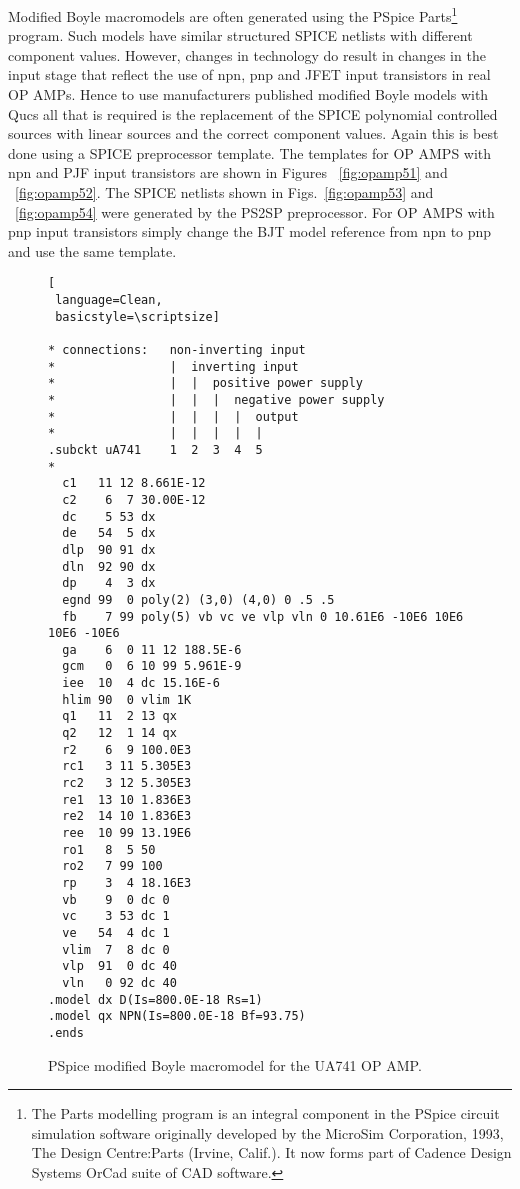 Modified Boyle macromodels are often generated using the PSpice Parts\footnote{The Parts modelling program is an integral component in the PSpice circuit simulation software originally developed by the MicroSim Corporation, 1993, The Design Centre:Parts (Irvine, Calif.). It now forms part of Cadence Design Systems OrCad suite of CAD software.} program.  Such models have similar structured SPICE netlists with different component values. However, changes in technology do result in changes in the input stage that reflect the use of npn, pnp and JFET input transistors in real OP AMPs.  Hence to use manufacturers published modified Boyle models with Qucs all that is required is the replacement of the SPICE polynomial controlled sources with linear sources and the correct component values. Again this is best done using a SPICE preprocessor template. The templates for OP AMPS with npn and PJF input transistors are shown in Figures ~\ref{fig:opamp51} and ~\ref{fig:opamp52}. The SPICE netlists shown in Figs.~\ref{fig:opamp53} and ~\ref{fig:opamp54} were generated by the PS2SP preprocessor.  For OP AMPS with pnp input transistors simply change the BJT model reference from npn to pnp and use the same template. 
\begin{figure} 
  \centering
\begin{lstlisting}[
 language=Clean, 
 basicstyle=\scriptsize]

* connections:   non-inverting input
*                |  inverting input
*                |  |  positive power supply
*                |  |  |  negative power supply
*                |  |  |  |  output
*                |  |  |  |  |
.subckt uA741    1  2  3  4  5
*
  c1   11 12 8.661E-12
  c2    6  7 30.00E-12
  dc    5 53 dx
  de   54  5 dx
  dlp  90 91 dx
  dln  92 90 dx
  dp    4  3 dx
  egnd 99  0 poly(2) (3,0) (4,0) 0 .5 .5
  fb    7 99 poly(5) vb vc ve vlp vln 0 10.61E6 -10E6 10E6 10E6 -10E6
  ga    6  0 11 12 188.5E-6
  gcm   0  6 10 99 5.961E-9
  iee  10  4 dc 15.16E-6
  hlim 90  0 vlim 1K
  q1   11  2 13 qx
  q2   12  1 14 qx
  r2    6  9 100.0E3
  rc1   3 11 5.305E3
  rc2   3 12 5.305E3
  re1  13 10 1.836E3
  re2  14 10 1.836E3
  ree  10 99 13.19E6
  ro1   8  5 50
  ro2   7 99 100
  rp    3  4 18.16E3
  vb    9  0 dc 0
  vc    3 53 dc 1
  ve   54  4 dc 1
  vlim  7  8 dc 0
  vlp  91  0 dc 40
  vln   0 92 dc 40
.model dx D(Is=800.0E-18 Rs=1)
.model qx NPN(Is=800.0E-18 Bf=93.75)
.ends
\end{lstlisting}
  \caption{PSpice modified Boyle macromodel for the UA741 OP AMP. } 
  \label{fig:opamp50}
\end{figure}

